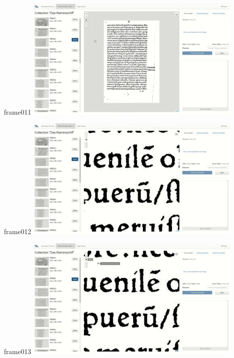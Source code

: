 \documentclass{beamer}
\begin{document}
\begin{frame}{frame011}
\includegraphics[width=0.8\textwidth]{output/exported-frames/frame011.png}
\note{}
\end{frame}

\begin{frame}{frame012}
\includegraphics[width=0.8\textwidth]{output/exported-frames/frame012.png}
\note{}
\end{frame}

\begin{frame}{frame013}
\includegraphics[width=0.8\textwidth]{output/exported-frames/frame013.png}
\note{}
\end{frame}
\end{document}
